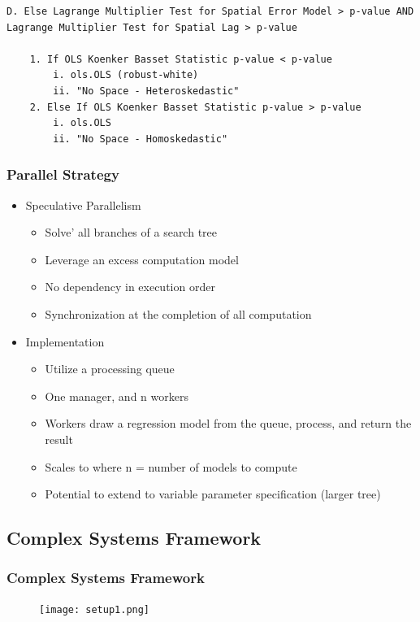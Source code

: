 \documentclass[usepdftitle=false,professionalfonts,compress ]{beamer}
\begin{document}
\begin{frame}[fragile,shrink=28]
\begin{tiny}
\begin{verbatim}
D. Else Lagrange Multiplier Test for Spatial Error Model > p-value AND Lagrange Multiplier Test for Spatial Lag > p-value

    1. If OLS Koenker Basset Statistic p-value < p-value
        i. ols.OLS (robust-white)
        ii. "No Space - Heteroskedastic"
    2. Else If OLS Koenker Basset Statistic p-value > p-value
        i. ols.OLS
        ii. "No Space - Homoskedastic"
\end{verbatim}
\end{tiny}
\end{frame}


{
\begin{frame}\frametitle{Parallel Strategy}
	\begin{itemize}

		\item Speculative Parallelism
		\begin{itemize}

			\item Solve' all branches of a search tree
			\item Leverage an excess computation model
			\item No dependency in execution order
			\item Synchronization at the completion of all computation
		\end{itemize}
		\item Implementation
		\begin{itemize}

			\item Utilize a processing queue
			\item One manager, and n workers
			\item Workers draw a regression model from the queue, process, and return the result
			\item Scales to where n = number of models to compute
			\item Potential to extend to variable parameter specification (larger tree)
		\end{itemize}
	\end{itemize}

\end{frame}
}


\subsection{Complex Systems Framework}


{
\begin{frame}\frametitle{Complex Systems Framework}

\begin{figure}
	\texttt{[image: setup1.png]}\end{figure}
\end{frame}
}
\end{document}
